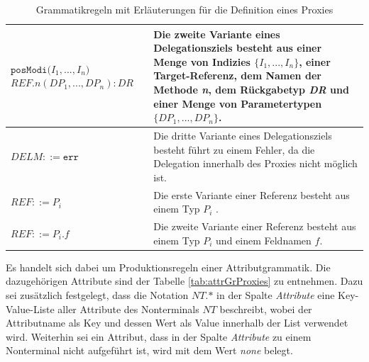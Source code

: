 \documentclass[a4paper,12pt]{article}
\begin{document}
\begin{table}[H]
\begin{tabular}{|p{5cm}|p{9cm}|}
$\texttt{posModi(} \mathit{I_1},...,\mathit{I_n} \texttt{)}$\newline
$\mathit{REF}.\mathit{n(\mathit{DP_1},...,\mathit{DP_n}):DR} $  
& Die zweite Variante eines Delegationsziels besteht aus einer Menge von Indizies $\{\mathit{I_1},...,\mathit{I_n}\}$, einer Target-Referenz, dem Namen der Methode \emph{n}, dem Rückgabetyp \emph{DR} und einer Menge von Parametertypen $\{\mathit{DP_1},...,\mathit{DP_n}\}$.\\
\hline
$\mathit{DELM} ::= \texttt{err} $  
& Die dritte Variante eines Delegationsziels besteht führt zu einem Fehler, da die Delegation innerhalb des Proxies nicht möglich ist.\\
\hline
$\mathit{REF} ::= \mathit{P_i}$
& Die erste Variante einer Referenz besteht aus einem Typ $P_i$ .\\
\hline
$\mathit{REF} ::= \mathit{P_i}\texttt{.}\mathit{f}$
& Die zweite Variante einer Referenz besteht aus einem Typ $P_i$ und einem Feldnamen $f$.\\
\hline
\end{tabular}
\caption{Grammatikregeln mit Erläuterungen für die Definition eines Proxies}
 \label{tab:grProxies}
\end{table}
\noindent
Es handelt sich dabei um Produktionsregeln einer Attributgrammatik. Die dazugehörigen Attribute sind der Tabelle \ref{tab:attrGrProxies} zu entnehmen. Dazu sei zusätzlich festgelegt, dass die Notation $\mathit{NT}\texttt{.}\text{*}$ in der Spalte \emph{Attribute} eine Key-Value-Liste aller Attribute des Nonterminals $\mathit{NT}$ beschreibt, wobei der Attributname als Key und dessen Wert als Value innerhalb der List verwendet wird. Weiterhin sei ein Attribut, dass in der Spalte \emph{Attribute} zu einem Nonterminal nicht aufgeführt ist, wird mit dem Wert \emph{none} belegt.
\end{document}
